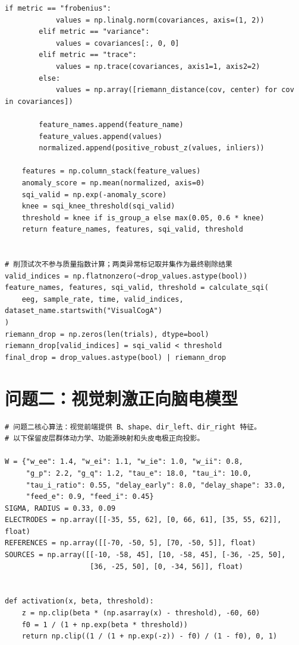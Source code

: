 \begin{appendices}
\begin{lstlisting}[style=appendixPython]
        if metric == "frobenius":
            values = np.linalg.norm(covariances, axis=(1, 2))
        elif metric == "variance":
            values = covariances[:, 0, 0]
        elif metric == "trace":
            values = np.trace(covariances, axis1=1, axis2=2)
        else:
            values = np.array([riemann_distance(cov, center) for cov in covariances])

        feature_names.append(feature_name)
        feature_values.append(values)
        normalized.append(positive_robust_z(values, inliers))

    features = np.column_stack(feature_values)
    anomaly_score = np.mean(normalized, axis=0)
    sqi_valid = np.exp(-anomaly_score)
    knee = sqi_knee_threshold(sqi_valid)
    threshold = knee if is_group_a else max(0.05, 0.6 * knee)
    return feature_names, features, sqi_valid, threshold


# 削顶试次不参与质量指数计算；两类异常标记取并集作为最终剔除结果
valid_indices = np.flatnonzero(~drop_values.astype(bool))
feature_names, features, sqi_valid, threshold = calculate_sqi(
    eeg, sample_rate, time, valid_indices, dataset_name.startswith("VisualCogA")
)
riemann_drop = np.zeros(len(trials), dtype=bool)
riemann_drop[valid_indices] = sqi_valid < threshold
final_drop = drop_values.astype(bool) | riemann_drop

\end{lstlisting}

\clearpage
\section{问题二：视觉刺激正向脑电模型}
\begin{lstlisting}[style=appendixPython]
# 问题二核心算法：视觉前端提供 B、shape、dir_left、dir_right 特征。
# 以下保留皮层群体动力学、功能源映射和头皮电极正向投影。

W = {"w_ee": 1.4, "w_ei": 1.1, "w_ie": 1.0, "w_ii": 0.8,
     "g_p": 2.2, "g_q": 1.2, "tau_e": 18.0, "tau_i": 10.0,
     "tau_i_ratio": 0.55, "delay_early": 8.0, "delay_shape": 33.0,
     "feed_e": 0.9, "feed_i": 0.45}
SIGMA, RADIUS = 0.33, 0.09
ELECTRODES = np.array([[-35, 55, 62], [0, 66, 61], [35, 55, 62]], float)
REFERENCES = np.array([[-70, -50, 5], [70, -50, 5]], float)
SOURCES = np.array([[-10, -58, 45], [10, -58, 45], [-36, -25, 50],
                    [36, -25, 50], [0, -34, 56]], float)


def activation(x, beta, threshold):
    z = np.clip(beta * (np.asarray(x) - threshold), -60, 60)
    f0 = 1 / (1 + np.exp(beta * threshold))
    return np.clip((1 / (1 + np.exp(-z)) - f0) / (1 - f0), 0, 1)



\end{lstlisting}
\end{appendices}
